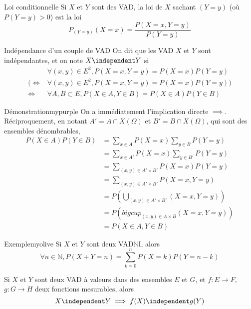     \begin{defi}{Loi conditionnelle}{}
        Si $X$ et $Y$ sont des VAD, la loi de $X$ sachant $(Y = y)$ (où $P(Y = y) > 0$) est la loi 
        \[ P_{(Y=y)}(X=x) = \frac{P(X=x,Y=y)}{P(Y=y)} \]    
    \end{defi}

    \begin{defitheo}{Indépendance d’un couple de VAD}{}
        On dit que les VAD $X$ et $Y$ sont indépendantes, et on note $X \independent Y$ si 
        \begin{align*}
            &\forall (x,y) \in E^2, P(X = x, Y = y) = P(X = x)P(Y=y) \\
            \bigg( \iff & \forall (x,y) \in E^2, P(X = x, Y = y) = P(X = x)P(Y=y) \bigg) \\
            \iff & \forall A,B \subset E, P(X \in A, Y \in B) = P(X \in A)P(Y \in B) 
        \end{align*}
    \end{defitheo}

    \begin{omed}{Démonstration}{mypurple}
        On a immédiatement l’implication directe $\implies$. Réciproquement, en notant $A' = A \cap X(\Omega)$ et $B' = B \cap X(\Omega)$, qui sont des ensembles dénombrables,
        \begin{align*}
            P(X \in A) P(Y \in B) &= \sum_{x \in A} P(X = x) \sum_{y \in B} P(Y = y) \\
            &= \sum_{x \in A'} P(X = x) \sum_{y \in B'} P(Y = y) \\
            &= \sum_{(x,y) \in A' \times B'} P(X=x)P(Y=y) \\
            &= \sum_{(x,y) \in A' \times B'} P(X=x,Y=y) \\
            &= P\left(\bigcup_{(x,y) \in A' \times B'} (X=x, Y = y)\right) \\
            &= P\left(bigcup_{(x,y) \in A \times B} (X=x, Y = y)\right) \\
            &= P(X \in A, Y \in B)
        \end{align*}
    \end{omed}

    \begin{omed}{Exemple}{myolive}
        Si $X$ et $Y$ sont deux VAD$\mathbb{N}$I, alors 
        \[ \forall n \in \mathbb{N}, P(X + Y = n) = \sum_{k= 0}^n P(X = k) P(Y = n-k) \]  
    \end{omed}

    \begin{coro}{}{}
        Si $X$ et $Y$ sont deux VAD à valeurs dans des ensembles $E$ et $G$, et $f : E \to F$, $g : G \to H$ deux fonctions mesurables, alors 
        \[ X \independent Y \implies f(X) \independent g(Y) \]   
    \end{coro}

